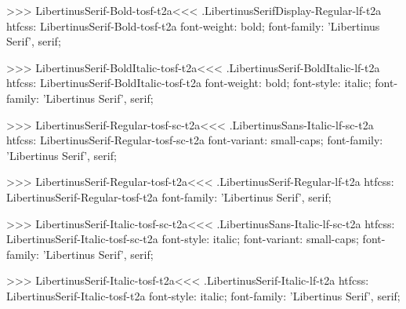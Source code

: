 {{{{{>>>
\<LibertinusSerif-Bold-tosf-t2a\><<<
.LibertinusSerifDisplay-Regular-lf-t2a
htfcss:  LibertinusSerif-Bold-tosf-t2a  font-weight: bold; font-family: 'Libertinus Serif', serif;

>>>
\<LibertinusSerif-BoldItalic-tosf-t2a\><<<
.LibertinusSerif-BoldItalic-lf-t2a
htfcss:  LibertinusSerif-BoldItalic-tosf-t2a  font-weight: bold; font-style: italic; font-family: 'Libertinus Serif', serif;

>>>
\<LibertinusSerif-Regular-tosf-sc-t2a\><<<
.LibertinusSans-Italic-lf-sc-t2a
htfcss:  LibertinusSerif-Regular-tosf-sc-t2a  font-variant: small-caps; font-family: 'Libertinus Serif', serif;

>>>
\<LibertinusSerif-Regular-tosf-t2a\><<<
.LibertinusSerif-Regular-lf-t2a
htfcss:  LibertinusSerif-Regular-tosf-t2a  font-family: 'Libertinus Serif', serif;

>>>
\<LibertinusSerif-Italic-tosf-sc-t2a\><<<
.LibertinusSans-Italic-lf-sc-t2a
htfcss:  LibertinusSerif-Italic-tosf-sc-t2a  font-style: italic; font-variant: small-caps; font-family: 'Libertinus Serif', serif;

>>>
\<LibertinusSerif-Italic-tosf-t2a\><<<
.LibertinusSerif-Italic-lf-t2a
htfcss:  LibertinusSerif-Italic-tosf-t2a  font-style: italic; font-family: 'Libertinus Serif', serif;

}}}}}
